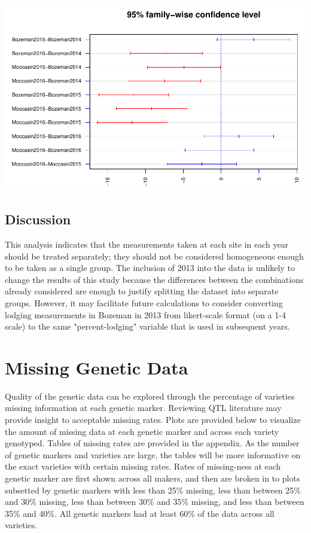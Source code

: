\documentclass[11pt]{article}\usepackage[]{graphicx}\usepackage[]{color}
\makeatletter
\def\maxwidth{ %
  \ifdim\Gin@nat@width>\linewidth
    \linewidth
  \else
    \Gin@nat@width
  \fi
}
\newenvironment{knitrout}{}{} %
\makeatother
\begin{document}
\begin{knitrout}\footnotesize
{}\color{fgcolor}

{\centering \includegraphics[width=\maxwidth]{figure/tukey-1} 

}



\end{knitrout}


\subsection{Discussion}
This analysis indicates that the measurements taken at each site in each year should be treated separately; they should not be considered homogeneous enough to be taken as a single group.  The inclusion of 2013 into the data is unlikely to change the results of this study because the differences between the combinations already considered are enough to justify splitting the dataset into separate groups.  However, it may facilitate future calculations to consider converting lodging measurements in Bozeman in 2013 from likert-scale format (on a 1-4 scale) to the same "percent-lodging" variable that is used in subsequent years. 


\pagebreak
\section{Missing Genetic Data}
Quality of the genetic data can be explored through the percentage of varieties missing information at each genetic marker. Reviewing QTL literature may provide insight to acceptable missing rates. Plots are provided below to visualize the amount of missing data at each genetic marker and across each variety genotyped. Tables of missing rates are provided in the appendix. As the number of genetic markers and varieties are large, the tables will be more informative on the exact varieties with certain missing rates. Rates of missing-ness at each genetic marker are first shown across all makers, and then are broken in to plots subsetted by genetic markers with less than 25\% missing, less than between 25\% and 30\% missing, less than between 30\% and 35\% missing, and less than between 35\% and 40\%. All genetic markers had at least 60\% of the data across all varieties.
\end{document}
